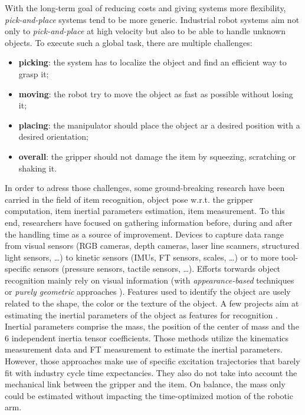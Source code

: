 \documentclass[/home/francois/latex/report/main.tex]{subfiles}
\begin{document}
With the long-term goal of reducing costs and giving systems more flexibility, \textit{pick-and-place} systems tend to be more generic. Industrial robot systems aim not only to \textit{pick-and-place} at high velocity but also to be able to handle unknown objects. To execute such a global task, there are multiple challenges:
\begin{itemize}
	\item \textbf{picking}: the system has to localize the object and find an efficient way to grasp it;
	\item \textbf{moving}: the robot try to move the object as fast as possible without losing it;
	\item \textbf{placing}: the manipulator should place the object ar a desired position with a desired orientation;
	\item \textbf{overall}: the gripper should not damage the item by squeezing, scratching or shaking it.
\end{itemize}

In order to adress those challenges, some ground-breaking research have been carried in the field of item recognition, object pose w.r.t. the gripper computation, item inertial parameters estimation, item measurement. To this end, researchers have focused on gathering information before, during and after the handling time as a source of improvement. Devices to capture data range from visual sensors (RGB cameras, depth cameras, laser line scanners, structured light sensors, \ldots) to kinetic sensors (\ac{IMUs}, \ac{FT} sensors, scales, \ldots) or to more tool-specific sensors (pressure sensors, tactile sensors, \ldots). Efforts torwards object recognition mainly rely on visual information (with \textit{appearance-based} techniques \cite{Carmichael2002, Schmid1997, Viola2001, Murase1993} or \textit{purely geometric} approaches \cite{Hut1987, Sethi2001}). Features used to identify the object are usely related to the shape, the color or the texture of the object. A few projects aim at estimating the inertial parameters of the object as features for recognition \cite{Kubus2008, Kubus2007, Kubus2014, Farsoni2018}. Inertial parameters comprise the mass, the position of the center of mass and the 6 independent inertia tensor coefficients. Those methods utilize the kinematics measurement data and \ac{FT} measurement to estimate the inertial parameters. However, those approaches make use of specific excitation trajectories that barely fit with industry cycle time expectancies. They also do not take into account the mechanical link between the gripper and the item. On balance, the mass only could be estimated without impacting the time-optimized motion of the robotic arm.
\end{document}
